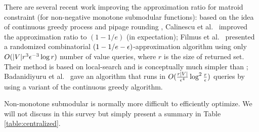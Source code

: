 There are several recent work improving the approximation ratio for matroid constraint (for non-negative monotone submodular functions): based on the idea of continuous greedy process \cite{V08} and pipage rounding \cite{AS04}, Calinescu et al.\ \cite{CCP+11} improved the approximation ratio to $(1 - 1/e)$ (in expectation); Filmus et al.\ \cite{FW14} presented a randomized combinatorial $(1 - 1/e -\epsilon)$-approximation algorithm using only $O(|V|r^3\epsilon^{-3}\log r)$ number of value queries, where $r$ is the size of returned set. Their method is based on local-search and is conceptually much simpler than \cite{CCP+11}; Badanidiyuru et al.\ \cite{BV14} gave an algorithm that runs in $O(\frac{r|V|}{\epsilon^4}\log^2\frac{r}{\epsilon})$ queries by using a variant of the continuous greedy algorithm.







Non-monotone submodular is normally more difficult to efficiently optimize. We will not discuss in this survey but simply present a summary in Table \ref{table:centralized}.













